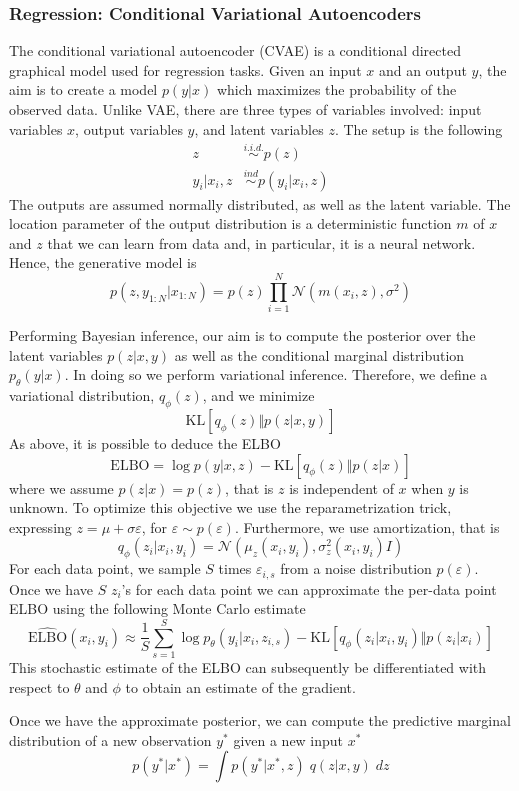 \subsubsection*{Regression: Conditional Variational Autoencoders} 
The conditional variational autoencoder (CVAE) is a conditional directed graphical model used for regression tasks. Given an input $x$ and an output $y$, the aim is to create a model $p(y|x)$ which maximizes the probability of the observed data. Unlike VAE, there are three types of variables involved: input variables $x$, output variables $y$, and latent variables $z$. The setup is the following
\begin{align*}
    z &\stackrel{\scriptscriptstyle i.i.d.}{\sim} p(z)\\
    y_i | x_i, z &\stackrel{\scriptscriptstyle ind}{\sim} p(y_i|x_i, z)
\end{align*}
The outputs are assumed normally distributed, as well as the latent variable. The location parameter of the output distribution is a deterministic function $m$ of $x$ and $z$ that we can learn from data and, in particular, it is a neural network. Hence, the generative model is
$$p(z, y_{1:N}|x_{1:N}) = p(z)\prod_{i=1}^{N} \mathcal{N}\left(m(x_i, z), \sigma^2\right)$$

Performing Bayesian inference, our aim is to compute the posterior over the latent variables $p(z|x, y)$ as well as the conditional marginal distribution $p_\theta(y|x)$. In doing so we perform variational inference. Therefore, we define a variational distribution, $q_\phi(z)$, and we minimize
$$\mathrm{KL}[q_\phi(z)\Vert p(z|x,y)]$$
As above, it is possible to deduce the ELBO
$$\mathrm{ELBO} = \log p(y|x,z) - \mathrm{KL}[q_\phi(z)\Vert p(z|x)]$$
where we assume $p(z|x) = p(z)$, that is $z$ is independent of $x$ when $y$ is unknown. To optimize this objective we use the reparametrization trick, expressing $z = \mu + \sigma \varepsilon$, for $\varepsilon\sim p(\varepsilon)$. Furthermore, we use amortization, that is
$$q_\phi(z_i|x_i, y_i) = \mathcal{N}\left(\mu_z(x_i, y_i), \sigma^2_z(x_i, y_i)I\right)$$
For each data point, we sample $S$ times $\varepsilon_{i,s}$ from a noise distribution $p(\varepsilon)$. Once we have $S$ $z_i$'s for each data point we can approximate the per-data point ELBO
using the following Monte Carlo estimate
$$\widehat{\mathrm{ELBO}}(x_i, y_i) \approx \frac{1}{S}\sum_{s=1}^{S} \log p_\theta(y_i|x_i, z_{i,s}) - \mathrm{KL}[q_\phi(z_i|x_i, y_i)\Vert p(z_i|x_i)]$$
This stochastic estimate of the ELBO can subsequently be differentiated with respect to $\theta$ and $\phi$ to obtain an estimate of the gradient.

Once we have the approximate posterior, we can compute the predictive marginal distribution of a new observation $y^*$ given a new input $x^*$
$$p(y^*|x^*) = \int p(y^*|x^*, z) \; q(z|x,y) \; dz$$











